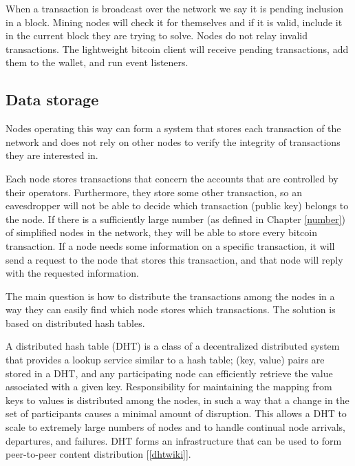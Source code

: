\documentclass[a4paper,12pt]{article}
\begin{document}
When a transaction is broadcast over the network we say it is pending inclusion in a block. Mining nodes will check it for themselves and if it is valid, include it in the current block they are trying to solve. Nodes do not relay invalid transactions. The lightweight bitcoin client will receive pending transactions, add them to the wallet, and run event listeners. 


\subsection{Data storage}
Nodes operating this way can form a system that stores each transaction of the network and does not rely on other nodes to verify the integrity of transactions they are interested in.

Each node stores transactions that concern the accounts that are controlled by their operators. Furthermore, they store some other transaction, so an eavesdropper will not be able to decide which transaction (public key) belongs to the node. If there is a sufficiently large number (as defined in Chapter \ref{number}) of simplified nodes in the network, they will be able to store every bitcoin transaction. If a node needs some information on a specific transaction, it will send a request to the node that stores this transaction, and that node will reply with the requested information.

The main question is how to distribute the transactions among the nodes in a way they can easily find which node stores which transactions.
The solution is based on distributed hash tables. 

A distributed hash table (DHT) is a class of a decentralized distributed system that provides a lookup service similar to a hash table; (key, value) pairs are stored in a DHT, and any participating node can efficiently retrieve the value associated with a given key. Responsibility for maintaining the mapping from keys to values is distributed among the nodes, in such a way that a change in the set of participants causes a minimal amount of disruption. This allows a DHT to scale to extremely large numbers of nodes and to handle continual node arrivals, departures, and failures. DHT forms an infrastructure that can be used to form peer-to-peer content distribution [\ref{dhtwiki}].
\end{document}

